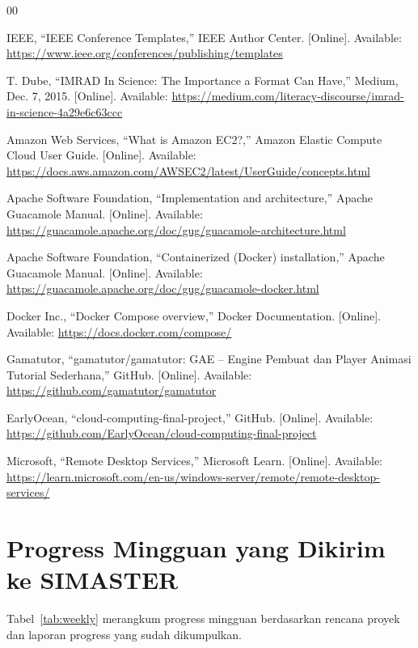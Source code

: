 \documentclass[conference]{IEEEtran}
\begin{document}
\begin{thebibliography}{00}

IEEE, ``IEEE Conference Templates,'' IEEE Author Center. [Online]. Available: \url{https://www.ieee.org/conferences/publishing/templates}

T. Dube, ``IMRAD In Science: The Importance a Format Can Have,'' Medium, Dec. 7, 2015. [Online]. Available: \url{https://medium.com/literacy-discourse/imrad-in-science-4a29e6c63ccc}

Amazon Web Services, ``What is Amazon EC2?,'' Amazon Elastic Compute Cloud User Guide. [Online]. Available: \url{https://docs.aws.amazon.com/AWSEC2/latest/UserGuide/concepts.html}

Apache Software Foundation, ``Implementation and architecture,'' Apache Guacamole Manual. [Online]. Available: \url{https://guacamole.apache.org/doc/gug/guacamole-architecture.html}

Apache Software Foundation, ``Containerized (Docker) installation,'' Apache Guacamole Manual. [Online]. Available: \url{https://guacamole.apache.org/doc/gug/guacamole-docker.html}

Docker Inc., ``Docker Compose overview,'' Docker Documentation. [Online]. Available: \url{https://docs.docker.com/compose/}

Gamatutor, ``gamatutor/gamatutor: GAE -- Engine Pembuat dan Player Animasi Tutorial Sederhana,'' GitHub. [Online]. Available: \url{https://github.com/gamatutor/gamatutor}

EarlyOcean, ``cloud-computing-final-project,'' GitHub. [Online]. Available: \url{https://github.com/EarlyOcean/cloud-computing-final-project}

Microsoft, ``Remote Desktop Services,'' Microsoft Learn. [Online]. Available: \url{https://learn.microsoft.com/en-us/windows-server/remote/remote-desktop-services/}

\end{thebibliography}

\clearpage
\onecolumn
\appendices

\section{Progress Mingguan yang Dikirim ke SIMASTER}

Tabel~\ref{tab:weekly} merangkum progress mingguan berdasarkan rencana proyek dan laporan progress yang sudah dikumpulkan.
\end{document}
